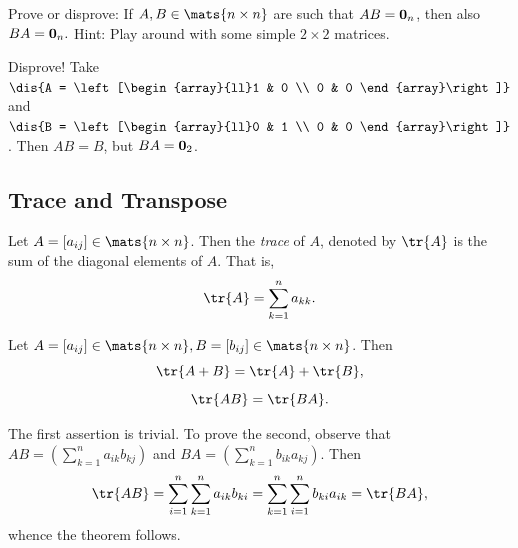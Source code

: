 \begin{exer}
Prove or disprove: If  $A,B\in\mats{n\times n}$ are
such that $AB = {\bf 0}_n$, then also $BA = {\bf 0}_n.$
Hint: Play around with some simple $2\times 2$ matrices.
\vspace*{1.75in}
\begin{answer}
Disprove! Take $\dis{A = \left[\begin{array}{ll}1 & 0 \\ 0 & 0
\end{array}\right]}$ and $\dis{B = \left[\begin{array}{ll}0 & 1 \\ 0 & 0
\end{array}\right]}$. Then $AB = B$, but
$BA = {\bf 0}_2$.
\end{answer}
\end{exer}

\newpage
\subsection{Trace and Transpose}\label{subsec:matT}
\begin{df}
Let $A = [a_{ij}] \in \mats{n\times n}$. Then the {\em trace}
of $A$, denoted by $\tr{A}$ is the sum of the diagonal elements of
$A$. That is,
$$\tr{A} = \sum _{k = 1} ^n a_{kk}.$$ 
\end{df}
\begin{thm}\label{tracethm}
Let $A = [a_{ij}] \in \mats{n\times n}, B = [b_{ij}]\in
\mats{n\times n}$. Then
\begin{equation}  \tr{A + B} = \tr{A} + \tr{B},\end{equation}
\begin{equation}  \tr{AB} = \tr{BA}.\end{equation}

\begin{pf}
The first assertion is trivial. To prove the second, observe that
$AB = (\sum _{k = 1} ^n a_{ik}b_{kj})$ and $BA = (\sum _{k = 1} ^n
b_{ik}a_{kj})$. Then
$$\tr{AB} = \sum _{i = 1} ^n \sum _{k = 1} ^n a_{ik}b_{ki} =
 \sum_{k = 1} ^n \sum _{i = 1} ^n b_{ki}a_{ik} = \tr{BA},
 $$whence the theorem follows.
\end{pf}
\end{thm}


